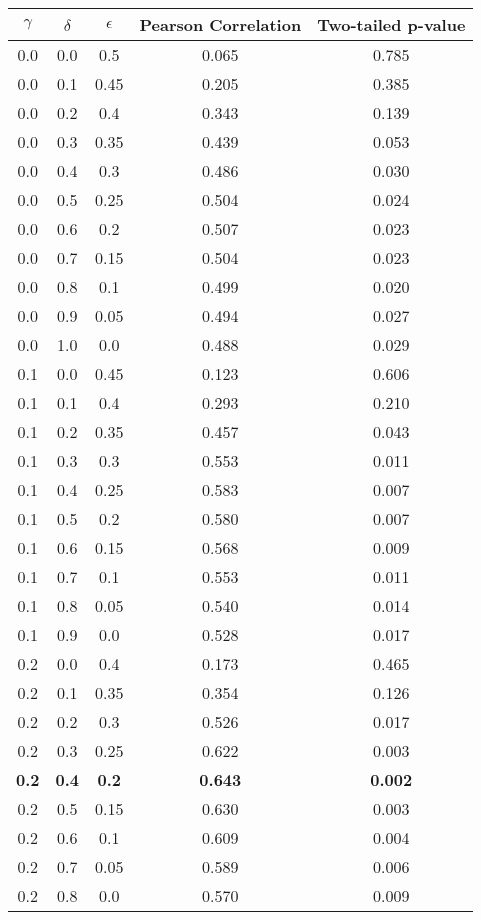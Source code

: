 \documentclass{article}
\begin{document}
\begin{table}[h!]
\centering
\begin{tabular}{|c|c|c||c|c|}
	\hline
	$\gamma$ & $\delta$ & $\epsilon$ & Pearson Correlation & Two-tailed p-value \\
	\hline
	\hline
	0.0 & 0.0 & 0.5 & 0.065 & 0.785 \\
	0.0 & 0.1 & 0.45 & 0.205 & 0.385 \\
	0.0 & 0.2 & 0.4 & 0.343 & 0.139 \\
	0.0 & 0.3 & 0.35 & 0.439 & 0.053 \\
	0.0 & 0.4 & 0.3 & 0.486 & 0.030 \\ 
	0.0 & 0.5 & 0.25 & 0.504 & 0.024 \\
	0.0 & 0.6 & 0.2 & 0.507 & 0.023 \\
	0.0 & 0.7 & 0.15 & 0.504 & 0.023 \\
	0.0 & 0.8 & 0.1 & 0.499 & 0.020 \\
	0.0 & 0.9 & 0.05 & 0.494 & 0.027 \\
	0.0 & 1.0 & 0.0 & 0.488 & 0.029 \\
	\hline
	0.1 & 0.0 & 0.45 & 0.123 & 0.606 \\
	0.1 & 0.1 & 0.4 & 0.293 & 0.210 \\
	0.1 & 0.2 & 0.35 & 0.457 & 0.043 \\
	0.1 & 0.3 & 0.3 & 0.553 & 0.011 \\
	0.1 & 0.4 & 0.25 & 0.583 & 0.007 \\
	0.1 & 0.5 & 0.2 & 0.580 & 0.007 \\
	0.1 & 0.6 & 0.15 & 0.568 & 0.009 \\
	0.1 & 0.7 & 0.1 & 0.553 & 0.011 \\
	0.1 & 0.8 & 0.05 & 0.540 & 0.014 \\
	0.1 & 0.9 & 0.0 & 0.528 & 0.017 \\
	\hline
	0.2 & 0.0 & 0.4 & 0.173 & 0.465 \\
	0.2 & 0.1 & 0.35 & 0.354 & 0.126 \\
	0.2 & 0.2 & 0.3 & 0.526 & 0.017 \\
	0.2 & 0.3 & 0.25 & 0.622 & 0.003 \\
	\textbf{0.2} & \textbf{0.4} & \textbf{0.2} & \textbf{0.643} & \textbf{0.002} \\
	0.2 & 0.5 & 0.15 & 0.630 & 0.003 \\
	0.2 & 0.6 & 0.1 & 0.609 & 0.004 \\
	0.2 & 0.7 & 0.05 & 0.589 & 0.006 \\
	0.2 & 0.8 & 0.0 & 0.570 & 0.009 \\

\end{tabular}
\end{table}
\end{document}
